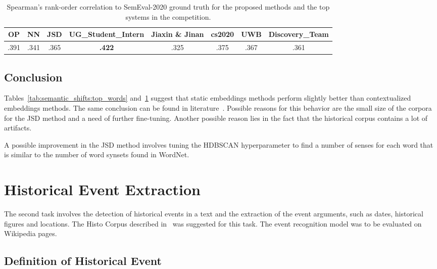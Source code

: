 \documentclass[runningheads]{llncs}
\begin{document}
\begin{table}
    \caption{Spearman's rank-order correlation to SemEval-2020 ground truth for the proposed methods and the top systems in the competition.}
    \label{tab:semantic_shifts:spearman}
    \centering
    \begin{tabular}{|c|c|c|c|c|c|c|c|}
        \toprule
        OP & NN & JSD & UG\_Student\_Intern & Jiaxin \& Jinan & cs2020 & UWB & Discovery\_Team \\
        \midrule
        .391 & .341 & .365 & \textbf{.422} & .325 & .375 & .367 & .361 \\
        \bottomrule
    \end{tabular}
\end{table}

\subsection{Conclusion}
\label{subsec:semantic_shifts:conclusion}

Tables~\ref{tab:semantic_shifts:top_words} and~\ref{tab:semantic_shifts:spearman} suggest that static embeddings methods perform slightly better than contextualized embeddings methods. The same conclusion can be found in literature~\cite{laicher-etal-2021-explaining,schlechtweg-etal-2020-semeval}. Possible reasons for this behavior are the small size of the corpora for the JSD method and a need of further fine-tuning. Another possible reason lies in the fact that the historical corpus contains a lot of artifacts.

A possible improvement in the JSD method involves tuning the HDBSCAN hyperparameter to find a number of senses for each word that is similar to the number of word synsets found in WordNet.

\section{Historical Event Extraction}
\label{sec:historical_events}

The second task involves the detection of historical events in a text and the extraction of the event arguments, such as dates, historical figures and locations. The Histo Corpus described in~\cite{sprugnoli-tonelli-2019-histo} was suggested for this task. The event recognition model was to be evaluated on Wikipedia pages.

\subsection{Definition of Historical Event}
\end{document}
